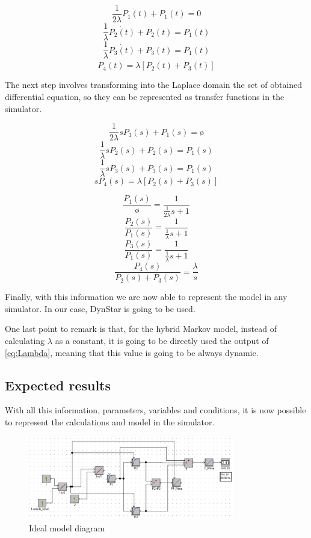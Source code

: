\documentclass{article}
\begin{document}
\begin{doublespacing}
$$ \frac{1}{2 \lambda} \dot{P_1 (t)} + P_1 (t) = 0 $$
$$ \frac{1}{\lambda} \dot{P_2 (t)} + P_2 (t) = P_1 (t) $$
$$ \frac{1}{\lambda} \dot{P_3 (t)} + P_3 (t) = P_1 (t) $$
$$ \dot{P_4 (t)} = \lambda [P_2 (t) + P_3 (t)]$$

\par The next step involves transforming into the Laplace domain the set of obtained differential equation, so they can be represented as transfer functions in the simulator.

$$ \frac{1}{2 \lambda} s P_1 (s) + P_1 (s) = ø $$
$$ \frac{1}{\lambda} s P_2 (s) + P_2 (s) = P_1 (s) $$
$$ \frac{1}{\lambda} s P_3 (s) + P_3 (s) = P_1 (s) $$
$$ s P_4 (s) = \lambda [P_2 (s) + P_3 (s)]$$

\vspace{10mm}
\begin{equation}
\frac{P_1 (s)}{ø} = \frac{1}{\frac{1}{2 \lambda} s + 1}
\label{eq: StateProbability}
\end{equation}
$$ \frac{P_2 (s)}{P_1 (s)} = \frac{1}{\frac{1}{\lambda} s + 1}$$
$$ \frac{P_3(s)}{P_1 (s)} = \frac{1}{\frac{1}{\lambda} s + 1}$$
$$ \frac{P_4 (s)}{P_2 (s) + P_3 (s)} = \frac{\lambda}{s}$$

\par Finally, with this information we are now able to represent the model in any simulator. In our case, DynStar is going to be used.

\par One last point to remark is that, for the hybrid Markov model, instead of calculating $\lambda$ as a constant, it is going to be directly used the output of \ref{eq:Lambda}, meaning that this value is going to be always dynamic.

\subsection{Expected results}

\par With all this information, parameters, variables and conditions, it is now possible to represent the calculations and model in the simulator.

\begin{figure}[H] 
    \centering
    \includegraphics[width=0.8\textwidth]{Images/ConnectionsIdeal.JPG} 
    \caption{Ideal model diagram} 
    \label{fig:IdealDiagram} 
\end{figure}


\end{doublespacing}
\end{document}
